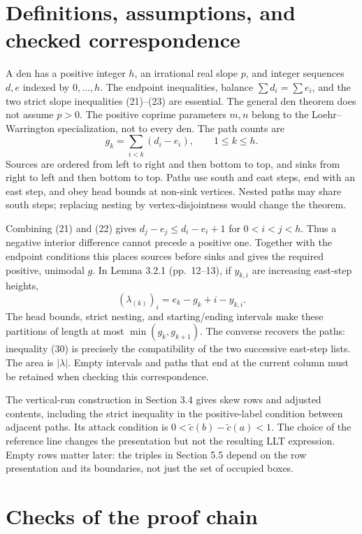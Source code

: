\documentclass[10pt]{article}
\begin{document}
\section*{Definitions, assumptions, and checked correspondence}
A den has a positive integer \(h\), an irrational real slope \(p\), and integer sequences \(d,e\) indexed by \(0,\ldots,h\). The endpoint inequalities, balance \(\sum d_i=\sum e_i\), and the two strict slope inequalities (21)–(23) are essential. The general den theorem does not assume \(p>0\). The positive coprime parameters \(m,n\) belong to the Loehr–Warrington specialization, not to every den. The path counts are \[g_k=\sum_{i<k}(d_i-e_i),\qquad 1\leq k\leq h.\] Sources are ordered from left to right and then bottom to top, and sinks from right to left and then bottom to top. Paths use south and east steps, end with an east step, and obey head bounds at non-sink vertices. Nested paths may share south steps; replacing nesting by vertex-disjointness would change the theorem.\par
Combining (21) and (22) gives \(d_j-e_j\leq d_i-e_i+1\) for \(0<i<j<h\). Thus a negative interior difference cannot precede a positive one. Together with the endpoint conditions this places sources before sinks and gives the required positive, unimodal \(g\). In Lemma 3.2.1 (pp. 12–13), if \(y_{k,i}\) are increasing east-step heights, \[(\lambda_{(k)})_i=e_k-g_k+i-y_{k,i}.\] The head bounds, strict nesting, and starting/ending intervals make these partitions of length at most \(\min(g_k,g_{k+1})\). The converse recovers the paths: inequality (30) is precisely the compatibility of the two successive east-step lists. The area is \(|\lambda|\). Empty intervals and paths that end at the current column must be retained when checking this correspondence.\par
The vertical-run construction in Section 3.4 gives skew rows and adjusted contents, including the strict inequality in the positive-label condition between adjacent paths. Its attack condition is \(0<\widetilde c(b)-\widetilde c(a)<1\). The choice of the reference line changes the presentation but not the resulting LLT expression. Empty rows matter later: the triples in Section 5.5 depend on the row presentation and its boundaries, not just the set of occupied boxes.\par
\section*{Checks of the proof chain}
\end{document}
